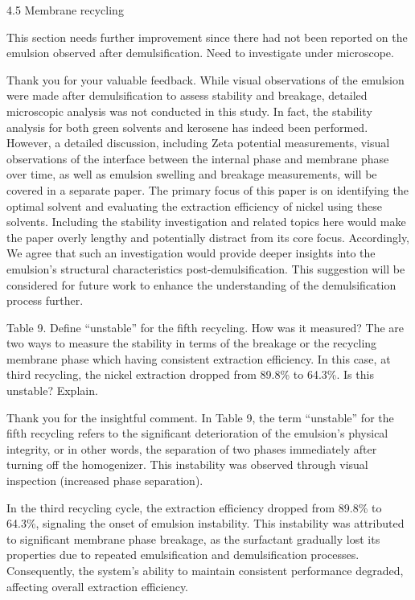 \documentclass[11pt,answers]{exam}
\begin{document}
\begin{questions}
4.5     Membrane recycling

\question This section needs further improvement since there had not been reported on the emulsion observed after demulsification. Need to investigate under microscope.

\begin{solutionorbox}
Thank you for your valuable feedback. While visual observations of the emulsion were made after demulsification to assess stability and breakage, detailed microscopic analysis was not conducted in this study. In fact, the stability analysis for both green solvents and kerosene has indeed been performed. However, a detailed discussion, including Zeta potential measurements, visual observations of the interface between the internal phase and membrane phase over time, as well as emulsion swelling and breakage measurements, will be covered in a separate paper. The primary focus of this paper is on identifying the optimal solvent and evaluating the extraction efficiency of nickel using these solvents. Including the stability investigation and related topics here would make the paper overly lengthy and potentially distract from its core focus. Accordingly, We agree that such an investigation would provide deeper insights into the emulsion's structural characteristics post-demulsification. This suggestion will be considered for future work to enhance the understanding of the demulsification process further.    
\end{solutionorbox}



\question Table 9. Define “unstable” for the fifth recycling. How was it measured? The are two ways to measure the stability in terms of the breakage or the recycling membrane phase which having consistent extraction efficiency. In this case, at third recycling, the nickel extraction dropped from 89.8\% to 64.3\%. Is this unstable? Explain.

\begin{solutionorbox}
Thank you for the insightful comment. In Table 9, the term “unstable” for the fifth recycling refers to the significant deterioration of the emulsion’s physical integrity, or in other words, the separation of two phases immediately after turning off the homogenizer. This instability was observed through visual inspection (increased phase separation). 

In the third recycling cycle, the extraction efficiency dropped from 89.8\% to 64.3\%, signaling the onset of emulsion instability. This instability was attributed to significant membrane phase breakage, as the surfactant gradually lost its properties due to repeated emulsification and demulsification processes. Consequently, the system's ability to maintain consistent performance degraded, affecting overall extraction efficiency.
 
\end{solutionorbox}



\end{questions}


\newpage


\end{document}
